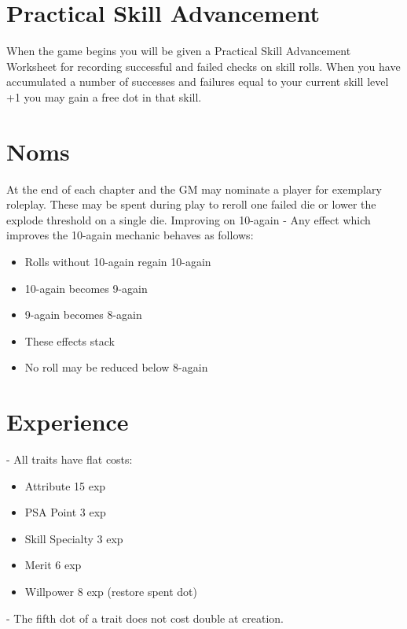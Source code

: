 \documentclass{article}
\begin{document}
\section{Practical Skill Advancement}
When the game begins you will be given a Practical Skill Advancement Worksheet for recording successful and failed checks on skill rolls. When you have accumulated a number of successes and failures equal to your current skill level +1 you may gain a free dot in that skill.

\section{Noms}
At the end of each chapter and the GM may nominate a player for exemplary roleplay. These may be spent during play to reroll one failed die or lower the explode threshold on a single die.
Improving on 10-again
- Any effect which improves the 10-again mechanic behaves as follows:
\begin{itemize}
	\item Rolls without 10-again regain 10-again
	\item 10-again becomes 9-again
	\item 9-again becomes 8-again
	\item These effects stack
	\item No roll may be reduced below 8-again
\end{itemize}

\section{Experience}
- All traits have flat costs:
\begin{itemize}
	\item Attribute 15 exp
	\item PSA Point 3 exp
	\item Skill Specialty 3 exp
	\item Merit 6 exp
	\item Willpower 8 exp (restore spent dot)
\end{itemize}
- The fifth dot of a trait does not cost double at creation.
\end{document}
